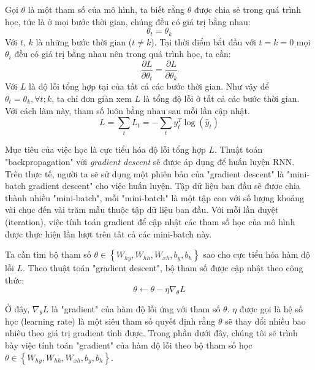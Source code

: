 Gọi $\theta$ là một tham số của mô hình, ta biết rằng $\theta$ được chia sẻ trong quá trình học, tức là ở mọi bước thời gian, chúng đều có giá trị bằng nhau:
\begin{equation} \label{weightSharing1}
	\theta_t = \theta_k
\end{equation}
Với $t$, $k$ là những bước thời gian ($t \ne k$). Tại thời điểm bắt đầu với $t=k=0$ mọi $\theta_i$ đều có giá trị bằng nhau nên trong quá trình học, ta cần:
\begin{equation} \label{weightSharing2}
	\frac{\partial L}{\partial \theta_t} = \frac{\partial L}{\partial \theta_k}
\end{equation}
Với $L$ là độ lỗi tổng hợp tại của tất cả các bước thời gian. Như vậy để $\theta_t = \theta_k, \forall t;k$, ta chỉ đơn giản xem $L$ là tổng độ lỗi ở tất cả các bước thời gian. Với cách làm này, tham số luôn bằng nhau sau mỗi lần cập nhật.
\begin{equation} \label{errorOfAll}
	L = \sum_{t}L_t = - \sum_{t} y_t^{T} \log(\hat{y}_t) 
\end{equation}

Mục tiêu của việc học là cực tiểu hóa độ lỗi tổng hợp $L$. Thuật toán "backpropagation" với \textit{gradient descent} sẽ được áp dụng để huấn luyện RNN. Trên thực tế, người ta sẽ sử dụng một phiên bản của "gradient descent" là "mini-batch gradient descent" cho việc huấn luyện. Tập dữ liệu ban đầu sẽ được chia thành nhiều "mini-batch", mỗi "mini-batch" là một tập con với số lượng khoảng vài chục đến vài trăm mẫu thuộc tập dữ liệu ban đầu. Với mỗi lần duyệt (iteration), việc tính toán gradient để cập nhật các tham số học của mô hình được thực hiện lần lượt trên tất cả các mini-batch này.

Ta cần tìm bộ tham số $\theta \in \left\{W_{hy},W_{hh},W_{xh},b_y,b_h \right \}$ sao cho cực tiểu hóa hàm độ lỗi $L$. Theo thuật toán "gradient descent", bộ tham số được cập nhật theo công thức:
\begin{equation} \label{gradientDescentWithTheta}
	\theta \leftarrow \theta - \eta \nabla_{\theta} L
\end{equation}

Ở đây, $\nabla_{\theta} L$ là "gradient" của hàm độ lỗi ứng với tham số $\theta$. $\eta$ được gọi là hệ số học (learning rate) là một siêu tham số quyết định rằng $\theta$ sẽ thay đổi nhiều bao nhiêu theo giá trị gradient tính được. Trong phần dưới đây, chúng tôi sẽ trình bày việc tính toán "gradient" của hàm độ lỗi theo bộ tham số học $\theta \in \left\{W_{hy},W_{hh},W_{xh},b_y,b_h \right \}$.

